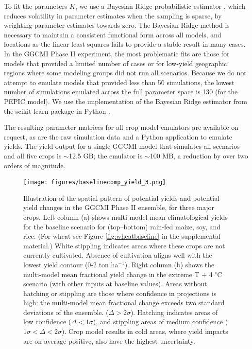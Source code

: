 \documentclass[preprint, 5p, times, twocolumn]{elsarticle}
\begin{document}
To fit the parameters $K$, we use a Bayesian Ridge probabilistic estimator \citep{MacKay91}, which reduces volatility in parameter estimates when the sampling is sparse, by weighting parameter estimates towards zero. The Bayesian Ridge method is necessary to maintain a consistent functional form across all models, and locations as the linear least squares fails to provide a stable result in many cases. In the GGCMI Phase II experiment, the most problematic fits are those for models that provided a limited number of cases or for low-yield geographic regions where some modeling groups did not run all scenarios. Because we do not attempt to emulate models that provided less than 50 simulations, the lowest number of simulations emulated across the full parameter space is 130 (for the PEPIC model). We use the implementation of the Bayesian Ridge estimator from the scikit-learn package in Python \citep{scikit-learn}. 

The resulting parameter matrices for all crop model emulators are available on request, as are the raw simulation data and a Python application to emulate yields. The yield output for a single GGCMI model that simulates all scenarios and all five crops is $\sim$12.5 GB; the emulator is $\sim$100 MB, a reduction by over two orders of magnitude. 

\begin{figure}[!htb]
\centering
   \texttt{[image: figures/baselinecomp\_yield\_3.png]} 
   \caption{Illustration of the spatial pattern of potential yields and potential yield changes in the GGCMI Phase II ensemble, for three major crops. Left column (a) shows multi-model mean climatological yields for the baseline scenario for (top--bottom) rain-fed maize, soy, and rice. (For wheat see Figure \ref{fig:wheatbaseline} in the supplemental material.) White stippling indicates areas where these crops are not currently cultivated. Absence of cultivation aligns well with the lowest yield contour (0-2 ton ha$^{-1}$). Right column (b) shows the multi-model mean fractional yield change in the extreme T + 4 $^{\circ}$C scenario (with other inputs at baseline values). Areas without hatching or stippling are those where confidence in projections is high: the multi-model mean fractional change exceeds two standard deviations of the ensemble. ($\Delta > 2\sigma$). Hatching indicates areas of low confidence ($\Delta < 1 \sigma$), and stippling areas of medium confidence ($1 \sigma < \Delta < 2 \sigma$). Crop model results in cold areas, where yield impacts are on average positive, also have the highest uncertainty.}
   \label{fig:maizesoybaseline}
\end{figure}
\end{document}

